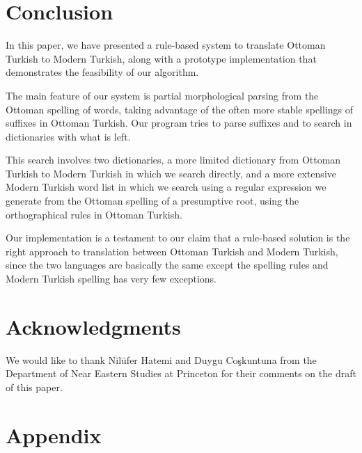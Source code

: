\documentclass[10pt,twocolumn]{article}
\theoremstyle{nonumberplain}
\begin{document}
\section{Conclusion}

In this paper, we have presented a rule-based system to translate Ottoman
Turkish to Modern Turkish, along with a prototype implementation that
demonstrates the feasibility of our algorithm.

The main feature of our system is partial morphological parsing from the Ottoman spelling of words, taking advantage of the often more stable spellings of suffixes in Ottoman Turkish. Our program tries to parse suffixes and to search in dictionaries with what is left.

This search involves two dictionaries, a more limited dictionary from Ottoman Turkish to Modern Turkish in which we search directly, and a more extensive Modern Turkish word list in which we search using a regular expression we generate from the Ottoman spelling of a presumptive root, using the orthographical rules in Ottoman Turkish.

Our implementation is a testament to our claim that a rule-based solution is the right approach to translation between Ottoman Turkish and Modern Turkish, since the two languages are basically the same except the spelling rules and Modern Turkish spelling has very few exceptions.

\section*{Acknowledgments}

We would like to thank Nilüfer Hatemi and Duygu Coşkuntuna
from the Department of Near Eastern Studies at Princeton
for their comments on the draft of this paper.




\clearpage
\appendix
\section{Appendix}

\end{document}
